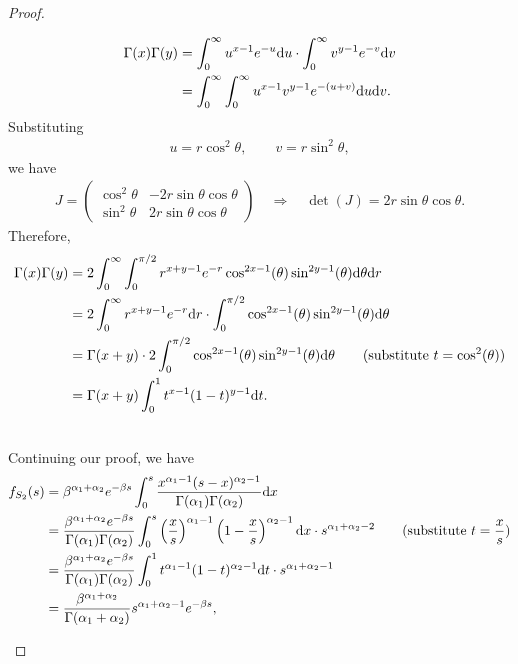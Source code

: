 \begin{proof}
\begin{itemize}
{\begin{minipage}{\linewidth}
\begin{align*}
				\Gamma(x)\Gamma(y) & = \int_0^{\infty} u^{x-1}e^{-u} \mathrm{d}u \cdot \int_0^{\infty} v^{y-1}e^{-v}\mathrm{d}v \\
				& = \int_0^{\infty} \int_0^{\infty} u^{x-1}v^{y-1} e^{-(u+v)}\mathrm{d}u\mathrm{d}v.
				\end{align*}
				Substituting
				\begin{align*}
				u = r\cos^2\theta, \qquad v = r\sin^2\theta,
				\end{align*}
				we have
				\begin{align*}
				J = \begin{pmatrix}
				\cos^2\theta & -2r\sin\theta\cos\theta \\
				\sin^2\theta & 2r\sin\theta\cos\theta
				\end{pmatrix} \quad \Rightarrow \quad \det(J) = 2r\sin\theta\cos\theta.
				\end{align*}
				Therefore,
				\begin{align*}
				\Gamma(x)\Gamma(y) & = 2\int_0^{\infty} \int_0^{\pi/2} r^{x+y-1} e^{-r} \cos^{2x-1}(\theta)\sin^{2y-1}(\theta) \mathrm{d}\theta\mathrm{d}r \\
				& = 2\int_0^{\infty} r^{x+y-1}e^{-r}\mathrm{d}r\cdot \int_0^{\pi/2} \cos^{2x-1}(\theta)\sin^{2y-1}(\theta) \mathrm{d}\theta \\
				& = \Gamma(x+y) \cdot 2\int_0^{\pi/2} \cos^{2x-1}(\theta)\sin^{2y-1}(\theta) \mathrm{d}\theta \qquad (\mathrm{substitute\ } t = \cos^2(\theta))\\
				& = \Gamma(x+y) \int_0^1 t^{x-1}(1-t)^{y-1} \mathrm{d}t.
				\end{align*}
			\end{minipage}
		}
		~\\
		Continuing our proof, we have
		\begin{align*}
		f_{S_2}(s) & = \beta^{\alpha_1 + \alpha_2}e^{-\beta s} \int_0^s \frac{x^{\alpha_1 - 1}(s-x)^{\alpha_2-1}}{\Gamma(\alpha_1)\Gamma(\alpha_2)}\U{d}x \\
		& = \frac{\beta^{\alpha_1 + \alpha_2} e^{-\beta s}}{\Gamma(\alpha_1)\Gamma(\alpha_2)} \int_0^s \left(\frac{x}{s} \right)^{\alpha_1-1}\left(1 - \frac{x}{s}\right)^{\alpha_2-1} \U{d} x \cdot s^{\alpha_1 + \alpha_2 - 2}\qquad (\U{substitute\ } t = \frac{x}{s}) \\
		& = \frac{\beta^{\alpha_1 + \alpha_2} e^{-\beta s}}{\Gamma(\alpha_1)\Gamma(\alpha_2)} \int_0^1 t^{\alpha_1-1} (1-t)^{\alpha_2-1} \U{d}t \cdot s^{\alpha_1 + \alpha_2 - 1} \\
		& = \frac{\beta^{\alpha_1 + \alpha_2}}{\Gamma(\alpha_1 + \alpha_2)} s^{\alpha_1 + \alpha_2 - 1}  e^{-\beta s},

\end{align*}
\end{itemize}
\end{proof}
